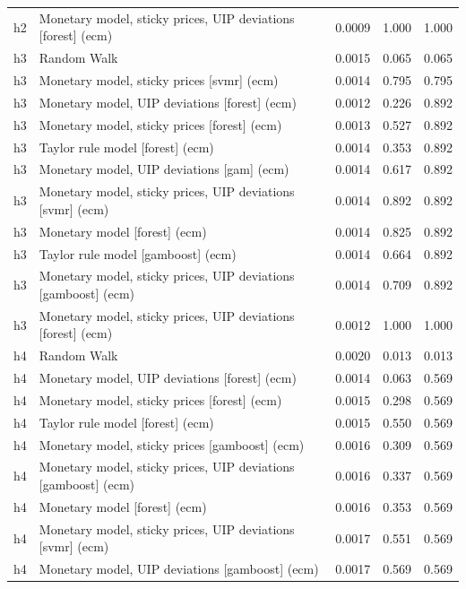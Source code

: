 \begin{ThreePartTable}
\begin{longtable}[t]{cp{5.5cm}ccc}
h2 & \raggedright Monetary model, sticky prices, UIP deviations [forest] (ecm) & 0.0009 & 1.000 & 1.000\\
\addlinespace
h3 & \raggedright Random Walk & 0.0015 & 0.065 & 0.065\\
h3 & \raggedright Monetary model, sticky prices [svmr] (ecm) & 0.0014 & 0.795 & 0.795\\
h3 & \raggedright Monetary model, UIP deviations [forest] (ecm) & 0.0012 & 0.226 & 0.892\\
h3 & \raggedright Monetary model, sticky prices [forest] (ecm) & 0.0013 & 0.527 & 0.892\\
h3 & \raggedright Taylor rule model [forest] (ecm) & 0.0014 & 0.353 & 0.892\\
h3 & \raggedright Monetary model, UIP deviations [gam] (ecm) & 0.0014 & 0.617 & 0.892\\
h3 & \raggedright Monetary model, sticky prices, UIP deviations [svmr] (ecm) & 0.0014 & 0.892 & 0.892\\
h3 & \raggedright Monetary model [forest] (ecm) & 0.0014 & 0.825 & 0.892\\
h3 & \raggedright Taylor rule model [gamboost] (ecm) & 0.0014 & 0.664 & 0.892\\
h3 & \raggedright Monetary model, sticky prices, UIP deviations [gamboost] (ecm) & 0.0014 & 0.709 & 0.892\\
h3 & \raggedright Monetary model, sticky prices, UIP deviations [forest] (ecm) & 0.0012 & 1.000 & 1.000\\
\addlinespace
h4 & \raggedright Random Walk & 0.0020 & 0.013 & 0.013\\
h4 & \raggedright Monetary model, UIP deviations [forest] (ecm) & 0.0014 & 0.063 & 0.569\\
h4 & \raggedright Monetary model, sticky prices [forest] (ecm) & 0.0015 & 0.298 & 0.569\\
h4 & \raggedright Taylor rule model [forest] (ecm) & 0.0015 & 0.550 & 0.569\\
h4 & \raggedright Monetary model, sticky prices [gamboost] (ecm) & 0.0016 & 0.309 & 0.569\\
h4 & \raggedright Monetary model, sticky prices, UIP deviations [gamboost] (ecm) & 0.0016 & 0.337 & 0.569\\
h4 & \raggedright Monetary model [forest] (ecm) & 0.0016 & 0.353 & 0.569\\
h4 & \raggedright Monetary model, sticky prices, UIP deviations [svmr] (ecm) & 0.0017 & 0.551 & 0.569\\
h4 & \raggedright Monetary model, UIP deviations [gamboost] (ecm) & 0.0017 & 0.569 & 0.569\\

\end{longtable}
\end{ThreePartTable}
